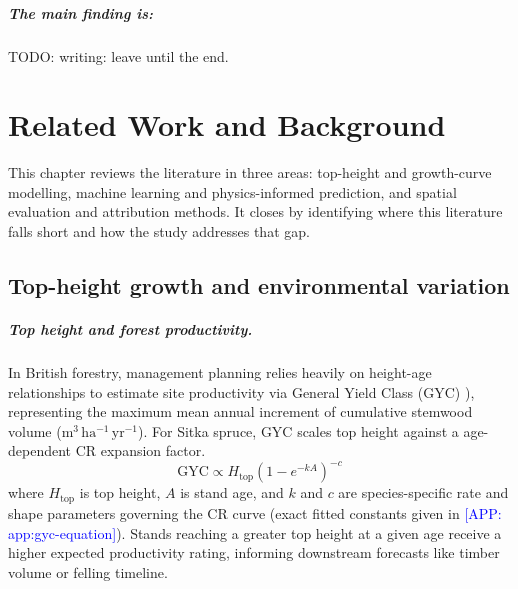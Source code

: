 \documentclass[logo,msc,ai]{infthesis}           %
\newcommand{\app}[1]{\textcolor{blue}{[APP: #1]}}
\begin{document}

\paragraph{The main finding is: } TODO: writing: leave until the end. 


\chapter{Related Work and Background}
\label{ch:background}

This chapter reviews the literature in three areas: top-height and growth-curve modelling, machine learning and physics-informed prediction, and spatial evaluation and attribution methods. It closes by identifying where this literature falls short and how the study addresses that gap.


\section{Top-height growth and environmental variation} 
\label{sec:background-top-height}

\paragraph*{Top height and forest productivity.}
In British forestry, management planning relies heavily on height-age relationships to estimate site productivity via General Yield Class (GYC) \cite{edwards1981Yield_C1_SS,ForestResearch2026Sitka_C1_SS}), representing the maximum mean annual increment of cumulative stemwood volume ($\mathrm{m^3\,ha^{-1}\,yr^{-1}}$). For Sitka spruce, GYC scales top height against a age-dependent CR expansion factor.
\begin{equation}
\mathrm{GYC} \propto H_{\mathrm{top}} \left(1 - e^{-k A}\right)^{-c}
\label{eq:gyc-proportional}
\end{equation}
where $H_{\mathrm{top}}$ is top height, $A$ is stand age, and $k$ and $c$ are species-specific rate and shape parameters governing the CR curve (exact fitted constants given in \app{app:gyc-equation}). Stands reaching a greater top height at a given age receive a higher expected productivity rating, informing downstream forecasts like timber volume or felling timeline. 
\end{document}
